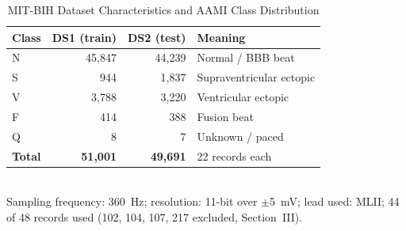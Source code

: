 \begin{table}[t]
\caption{MIT-BIH Dataset Characteristics and AAMI Class Distribution}
\label{tab:dataset}
\centering
\begin{tabular}{lrrl}
\toprule
\textbf{Class} & \textbf{DS1 (train)} & \textbf{DS2 (test)} & \textbf{Meaning} \\
\midrule
N & 45{,}847 & 44{,}239 & Normal / BBB beat \\
S & 944     & 1{,}837  & Supraventricular ectopic \\
V & 3{,}788  & 3{,}220  & Ventricular ectopic \\
F & 414     & 388     & Fusion beat \\
Q & 8       & 7       & Unknown / paced \\
\midrule
\textbf{Total} & \textbf{51{,}001} & \textbf{49{,}691} & 22 records each \\
\bottomrule
\end{tabular}
\\[4pt]
\footnotesize Sampling frequency: 360~Hz; resolution: 11-bit over $\pm$5~mV;
lead used: MLII; 44 of 48 records used (102, 104, 107, 217 excluded, Section~III).
\end{table}
